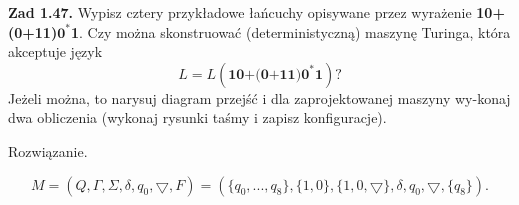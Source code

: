 \documentclass[12pt]{article}
\begin{document}
\newpage

\noindent\textbf{Zad 1.47.} Wypisz cztery przykładowe łańcuchy opisywane przez wyrażenie \textbf{10+(0+11)$\textbf{0}^*$1}. Czy można skonstruować (deterministyczną) maszynę Turinga, która akceptuje język
\[L=L(\textbf{10+(0+11)$\textbf{0}^*$1})?\]
Jeżeli można, to narysuj diagram przejść i dla zaprojektowanej maszyny wy-konaj dwa obliczenia (wykonaj rysunki taśmy i zapisz konfiguracje).

 Rozwiązanie.
 
\[M=(Q,\Gamma,\Sigma,\delta,q_0,\bigtriangledown,F)=(\{q_0,...,q_8\},\{1,0\},\{1,0,\bigtriangledown\},\delta,q_0,\bigtriangledown,\{q_8\}).\]

\begin{center}
\end{center}
\end{document}
